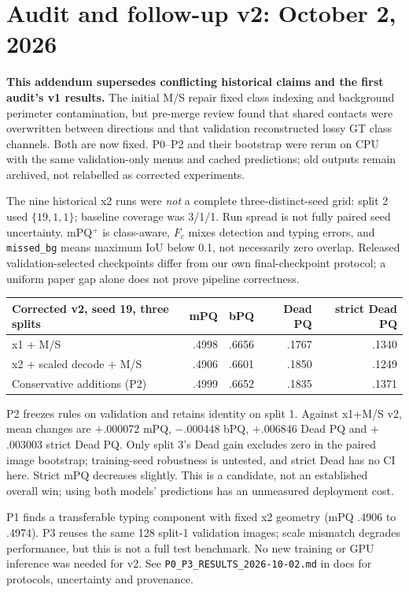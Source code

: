 \section*{Audit and follow-up v2: October 2, 2026}
\textbf{This addendum supersedes conflicting historical claims and the first audit's v1 results.}
The initial M/S repair fixed class indexing and background perimeter contamination, but
pre-merge review found that shared contacts were overwritten between directions and that
validation reconstructed lossy GT class channels. Both are now fixed. P0--P2 and their
bootstrap were rerun on CPU with the same validation-only menus and cached predictions;
old outputs remain archived, not relabelled as corrected experiments.

The nine historical x2 runs were \emph{not} a complete three-distinct-seed grid:
split 2 used $\{19,1,1\}$; baseline coverage was 3/1/1. Run spread is not fully paired
seed uncertainty. mPQ$^+$ is class-aware, $F_c$ mixes detection and typing errors, and
\texttt{missed\_bg} means maximum IoU below 0.1, not necessarily zero overlap. Released
validation-selected checkpoints differ from our own final-checkpoint protocol;
a uniform paper gap alone does not prove pipeline correctness.

\begin{center}\small
\begin{tabular}{lrrrr}
\toprule
Corrected v2, seed 19, three splits & mPQ & bPQ & Dead PQ & strict Dead PQ\\
\midrule
x1 + M/S & .4998 & .6656 & .1767 & .1340\\
x2 + scaled decode + M/S & .4906 & .6601 & .1850 & .1249\\
Conservative additions (P2) & .4999 & .6652 & .1835 & .1371\\
\bottomrule
\end{tabular}
\end{center}

P2 freezes rules on validation and retains identity on split 1. Against x1+M/S v2,
mean changes are $+$.000072 mPQ, $-$.000448 bPQ, $+$.006846 Dead PQ and
$+$.003003 strict Dead PQ. Only split 3's Dead gain excludes zero in the paired
image bootstrap; training-seed robustness is untested, and strict Dead has no CI here.
Strict mPQ decreases slightly. This is a candidate, not an established overall win;
using both models' predictions has an unmeasured deployment cost.

P1 finds a transferable typing component with fixed x2 geometry (mPQ .4906 to .4974).
P3 reuses the same 128 split-1 validation images; scale mismatch degrades performance,
but this is not a full test benchmark. No new training or GPU inference was needed for v2.
See \texttt{P0\_P3\_RESULTS\_2026-10-02.md} in docs for protocols, uncertainty and provenance.
\clearpage
